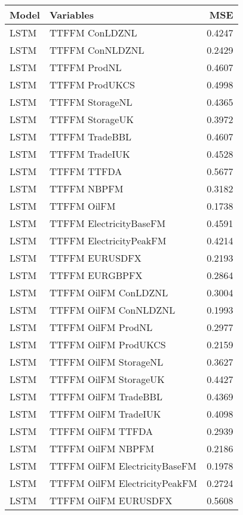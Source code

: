 \begin{table}[h!]
\centering
 \begin{adjustbox}{max width=\textwidth}
\begin{tabular}{llr}
  \hline
Model & Variables & MSE \\ 
  \hline
LSTM & TTFFM ConLDZNL & 0.4247 \\ 
  LSTM & TTFFM ConNLDZNL & 0.2429 \\ 
  LSTM & TTFFM ProdNL & 0.4607 \\ 
  LSTM & TTFFM ProdUKCS & 0.4998 \\ 
  LSTM & TTFFM StorageNL & 0.4365 \\ 
  LSTM & TTFFM StorageUK & 0.3972 \\ 
  LSTM & TTFFM TradeBBL & 0.4607 \\ 
  LSTM & TTFFM TradeIUK & 0.4528 \\ 
  LSTM & TTFFM TTFDA & 0.5677 \\ 
  LSTM & TTFFM NBPFM & 0.3182 \\ 
  LSTM & TTFFM OilFM & 0.1738 \\ 
  LSTM & TTFFM ElectricityBaseFM & 0.4591 \\ 
  LSTM & TTFFM ElectricityPeakFM & 0.4214 \\ 
  LSTM & TTFFM EURUSDFX & 0.2193 \\ 
  LSTM & TTFFM EURGBPFX & 0.2864 \\ 
  LSTM & TTFFM OilFM ConLDZNL & 0.3004 \\ 
  LSTM & TTFFM OilFM ConNLDZNL & 0.1993 \\ 
  LSTM & TTFFM OilFM ProdNL & 0.2977 \\ 
  LSTM & TTFFM OilFM ProdUKCS & 0.2159 \\ 
  LSTM & TTFFM OilFM StorageNL & 0.3627 \\ 
  LSTM & TTFFM OilFM StorageUK & 0.4427 \\ 
  LSTM & TTFFM OilFM TradeBBL & 0.4369 \\ 
  LSTM & TTFFM OilFM TradeIUK & 0.4098 \\ 
  LSTM & TTFFM OilFM TTFDA & 0.2939 \\ 
  LSTM & TTFFM OilFM NBPFM & 0.2186 \\ 
  LSTM & TTFFM OilFM ElectricityBaseFM & 0.1978 \\ 
  LSTM & TTFFM OilFM ElectricityPeakFM & 0.2724 \\ 
  LSTM & TTFFM OilFM EURUSDFX & 0.5608 \\ 

\end{tabular}
\end{adjustbox}
\end{table}
